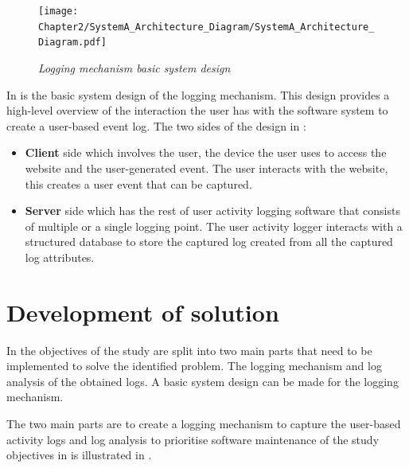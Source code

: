  \begin{figure}[!htb]
	 \centering %
	 \texttt{[image: Chapter2/SystemA\_Architecture\_Diagram/SystemA\_Architecture\_Diagram.pdf]}
	 \caption[Logging mechanism basic system design]
	 {\textit{Logging mechanism basic system design}}\label{fig:ch2_systemDesign}
 \end{figure}
 
 In  is the basic system design of the logging mechanism. This design provides a high-level overview of the interaction the user has with the software system to create a user-based event log. The two sides of the design in :
 
 \begin{itemize}
	 \item \textbf{Client} side which involves the user, the device the user uses to access the website and the user-generated event. The user interacts with the website, this creates a user event that can be captured. 
	 \item \textbf{Server} side which has the rest of user activity logging software that consists of multiple or a single logging point. The user activity logger interacts with a structured database to store the captured log created from all the captured log attributes.
 \end{itemize}

\section{Development of solution}\label{sec:ch2_developementOfSolution}
In  the objectives of the study are split into two main parts that need to be implemented to solve the identified problem. The logging mechanism and log analysis of the obtained logs. A basic system design can be made for the logging mechanism. 

The two main parts are to create a logging mechanism to capture the user-based activity logs and log analysis to prioritise software maintenance of the study objectives in  is illustrated in .

\clearpage

